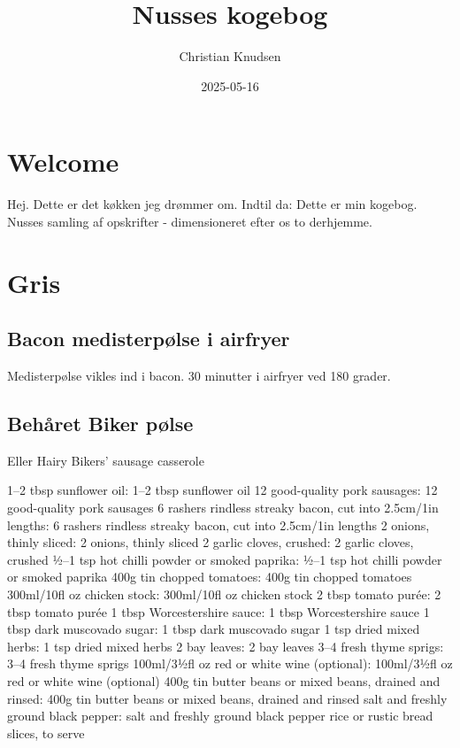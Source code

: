 \documentclass[
]{book}
\title{Nusses kogebog}
\author{Christian Knudsen}
\date{2025-05-16}
\makeatletter
\newcommand*\pandocbounded[1]{%
  \sbox\pandoc@box{#1}%
  \Gscale@div\@tempa{\textheight}{\dimexpr\ht\pandoc@box+\dp\pandoc@box\relax}%
  \Gscale@div\@tempb{\linewidth}{\wd\pandoc@box}%
  \ifdim\@tempb\p@<\@tempa\p@\let\@tempa\@tempb\fi%
  \ifdim\@tempa\p@<\p@\scalebox{\@tempa}{\usebox\pandoc@box}%
  \else\usebox{\pandoc@box}%
  \fi%
}
\makeatother
\begin{document}
\maketitle

{
\setcounter{tocdepth}{1}
\tableofcontents
}
\chapter{Welcome}\label{welcome}

Hej. Dette er det køkken jeg drømmer om. Indtil da:
Dette er min kogebog. Nusses samling af opskrifter - dimensioneret efter os to derhjemme.

\pandocbounded{\texttt{[image: images/DALL·E-dieselpunk.png]}}

\chapter{Gris}\label{gris}

\section{Bacon medisterpølse i airfryer}\label{bacon-medisterpuxf8lse-i-airfryer}

Medisterpølse vikles ind i bacon.
30 minutter i airfryer ved 180 grader.

\section{Behåret Biker pølse}\label{behuxe5ret-biker-puxf8lse}

Eller Hairy Bikers' sausage casserole

1--2 tbsp sunflower oil: 1--2 tbsp sunflower oil
12 good-quality pork sausages: 12 good-quality pork sausages
6 rashers rindless streaky bacon, cut into 2.5cm/1in lengths: 6 rashers rindless streaky bacon, cut into 2.5cm/1in lengths
2 onions, thinly sliced: 2 onions, thinly sliced
2 garlic cloves, crushed: 2 garlic cloves, crushed
½--1 tsp hot chilli powder or smoked paprika: ½--1 tsp hot chilli powder or smoked paprika
400g tin chopped tomatoes: 400g tin chopped tomatoes
300ml/10fl oz chicken stock: 300ml/10fl oz chicken stock
2 tbsp tomato purée: 2 tbsp tomato purée
1 tbsp Worcestershire sauce: 1 tbsp Worcestershire sauce
1 tbsp dark muscovado sugar: 1 tbsp dark muscovado sugar
1 tsp dried mixed herbs: 1 tsp dried mixed herbs
2 bay leaves: 2 bay leaves
3--4 fresh thyme sprigs: 3--4 fresh thyme sprigs
100ml/3½fl oz red or white wine (optional): 100ml/3½fl oz red or white wine (optional)
400g tin butter beans or mixed beans, drained and rinsed: 400g tin butter beans or mixed beans, drained and rinsed
salt and freshly ground black pepper: salt and freshly ground black pepper
rice or rustic bread slices, to serve
\end{document}
